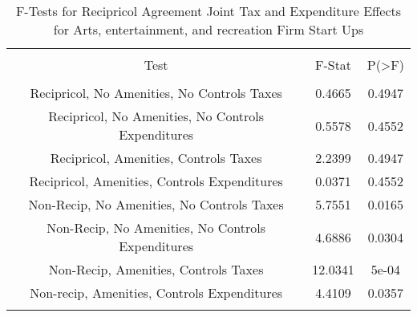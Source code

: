 
\begin{table}[!htbp] \centering 
  \caption{F-Tests for Recipricol Agreement Joint Tax and Expenditure Effects for Arts, entertainment, and recreation Firm Start Ups} 
  \label{71Ftests} 
\begin{tabular}{@{\extracolsep{5pt}} ccc} 
\\[-1.8ex]\hline 
\hline \\[-1.8ex] 
Test & F-Stat & P(\textgreater F) \\ 
\hline \\[-1.8ex] 
Recipricol, No Amenities, No Controls Taxes & 0.4665 & 0.4947 \\ 
Recipricol, No Amenities, No Controls Expenditures & 0.5578 & 0.4552 \\ 
Recipricol, Amenities, Controls Taxes & 2.2399 & 0.4947 \\ 
Recipricol, Amenities, Controls Expenditures & 0.0371 & 0.4552 \\ 
Non-Recip, No Amenities, No Controls Taxes & 5.7551 & 0.0165 \\ 
Non-Recip, No Amenities, No Controls Expenditures & 4.6886 & 0.0304 \\ 
Non-Recip, Amenities, Controls Taxes & 12.0341 & 5e-04 \\ 
Non-recip, Amenities, Controls Expenditures & 4.4109 & 0.0357 \\ 
\hline \\[-1.8ex] 
\end{tabular} 
\end{table} 
